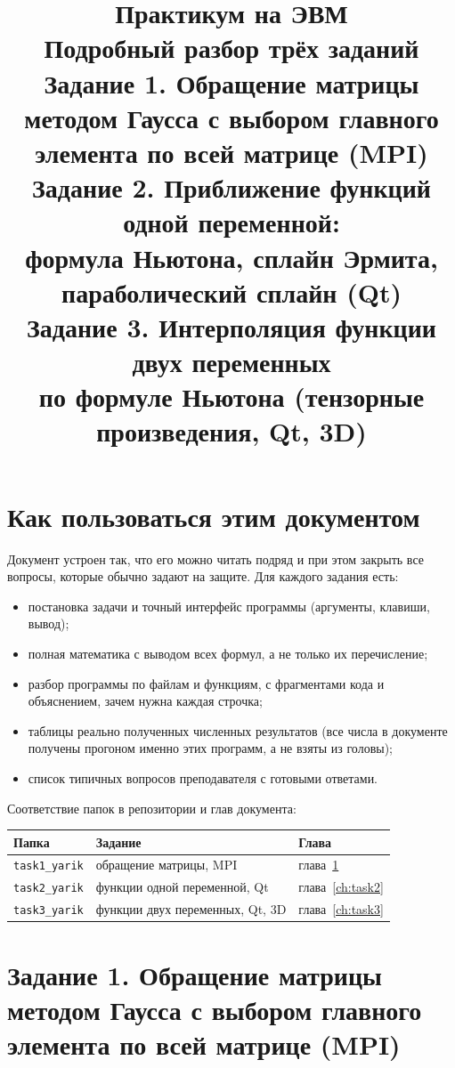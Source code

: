 \documentclass[11pt,a4paper]{report}
\title{\Huge Практикум на ЭВМ\\[6pt] \LARGE Подробный разбор трёх заданий\\[14pt]
\large Задание 1. Обращение матрицы методом Гаусса с выбором главного элемента
по всей матрице (MPI)\\[4pt]
Задание 2. Приближение функций одной переменной:\\ формула Ньютона, сплайн Эрмита,
параболический сплайн (Qt)\\[4pt]
Задание 3. Интерполяция функции двух переменных\\ по формуле Ньютона
(тензорные произведения, Qt, 3D)}
\author{}
\date{}
\begin{document}
\maketitle

\chapter*{Как пользоваться этим документом}

Документ устроен так, что его можно читать подряд и при этом закрыть все вопросы,
которые обычно задают на защите. Для каждого задания есть:

\begin{itemize}[nosep]
\item постановка задачи и точный интерфейс программы (аргументы, клавиши, вывод);
\item полная математика с выводом всех формул, а не только их перечисление;
\item разбор программы по файлам и функциям, с фрагментами кода и объяснением,
      зачем нужна каждая строчка;
\item таблицы реально полученных численных результатов (все числа в документе
      получены прогоном именно этих программ, а не взяты из головы);
\item список типичных вопросов преподавателя с готовыми ответами.
\end{itemize}

Соответствие папок в репозитории и глав документа:

\begin{center}
\begin{tabular}{lll}
\toprule
Папка & Задание & Глава \\
\midrule
\texttt{task1\_yarik} & обращение матрицы, MPI & глава~\ref{ch:task1} \\
\texttt{task2\_yarik} & функции одной переменной, Qt & глава~\ref{ch:task2} \\
\texttt{task3\_yarik} & функции двух переменных, Qt, 3D & глава~\ref{ch:task3} \\
\bottomrule
\end{tabular}
\end{center}

\tableofcontents

\chapter{Задание 1. Обращение матрицы методом Гаусса с выбором главного элемента по всей матрице (MPI)}
\label{ch:task1}
\end{document}
